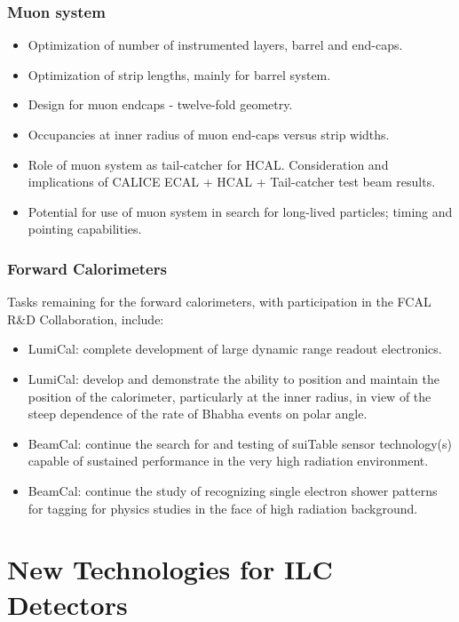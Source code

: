 \subsubsection{Muon system}
\begin{itemize}
\item Optimization of number of instrumented layers, barrel and end-caps.
\item Optimization of strip lengths, mainly for barrel system.
\item Design for muon endcaps - twelve-fold geometry.
\item Occupancies at inner radius of muon end-caps versus strip widths.
\item Role of muon system as tail-catcher for HCAL. Consideration and implications of CALICE ECAL + HCAL + Tail-catcher test beam results.
\item Potential for use of muon system in search for long-lived particles; timing and pointing capabilities.
\end{itemize}
 
\subsubsection{Forward Calorimeters}
Tasks remaining for the forward calorimeters, with participation in the FCAL R\&D 
Collaboration, include:

\begin{itemize}
\item LumiCal: complete development of large dynamic range readout electronics.

\item LumiCal: develop and demonstrate the ability to position and maintain the position of the calorimeter, particularly at the inner 
radius, in view of the steep dependence of the rate of Bhabha events on polar angle.

\item BeamCal: continue the search for and testing of suiTable sensor technology(s) capable of sustained performance in the very high radiation environment.

\item BeamCal: continue the study of recognizing single electron shower patterns for tagging for physics studies in the face of high radiation background.
\end{itemize}


\section{New Technologies for ILC Detectors} 
\label{sec:detectortech}



